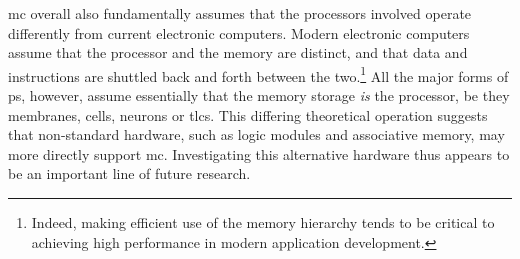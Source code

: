 \Gls{mc} overall also fundamentally assumes that the processors involved operate differently from current electronic computers.  Modern electronic computers assume that the processor and the memory are distinct, and that data and instructions are shuttled back and forth between the two.\footnote{Indeed, making efficient use of the memory hierarchy tends to be critical to achieving high performance in modern application development.}  All the major forms of \gls{ps}, however, assume essentially that the memory storage \emph{is} the processor, be they membranes, cells, neurons or \glspl{tlc}.  This differing theoretical operation suggests that non-standard hardware, such as logic modules and associative memory, may more directly support \gls{mc}.  Investigating this alternative hardware thus appears to be an important line of future research.





